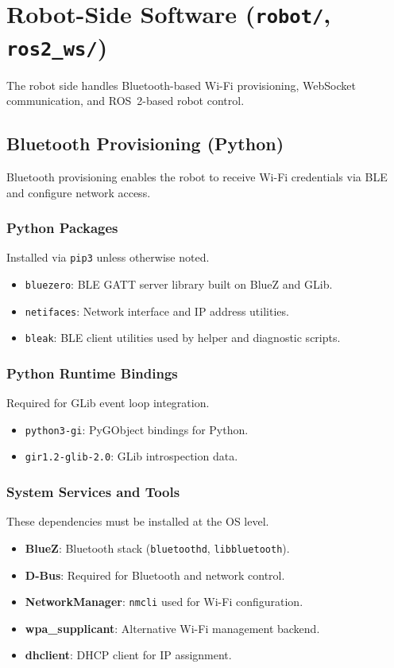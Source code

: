 \documentclass[11pt,a4paper]{article}
\begin{document}
\section{Robot-Side Software (\texttt{robot/}, \texttt{ros2\_ws/})}
The robot side handles Bluetooth-based Wi-Fi provisioning, WebSocket communication, and ROS~2-based robot control.

\subsection{Bluetooth Provisioning (Python)}
Bluetooth provisioning enables the robot to receive Wi-Fi credentials via BLE and configure network access.

\subsubsection{Python Packages}
Installed via \texttt{pip3} unless otherwise noted.
\begin{itemize}
	\item \texttt{bluezero}: BLE GATT server library built on BlueZ and GLib.
	\item \texttt{netifaces}: Network interface and IP address utilities.
	\item \texttt{bleak}: BLE client utilities used by helper and diagnostic scripts.
\end{itemize}

\subsubsection{Python Runtime Bindings}
Required for GLib event loop integration.
\begin{itemize}
	\item \texttt{python3-gi}: PyGObject bindings for Python.
	\item \texttt{gir1.2-glib-2.0}: GLib introspection data.
\end{itemize}

\subsubsection{System Services and Tools}
These dependencies must be installed at the OS level.
\begin{itemize}
	\item \textbf{BlueZ}: Bluetooth stack (\texttt{bluetoothd}, \texttt{libbluetooth}).
	\item \textbf{D-Bus}: Required for Bluetooth and network control.
	\item \textbf{NetworkManager}: \texttt{nmcli} used for Wi-Fi configuration.
	\item \textbf{wpa\_supplicant}: Alternative Wi-Fi management backend.
	\item \textbf{dhclient}: DHCP client for IP assignment.
\end{itemize}
\end{document}
